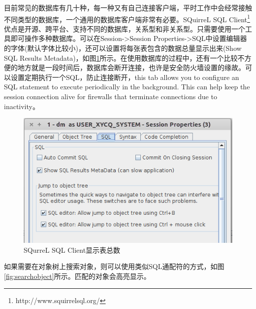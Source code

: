 \documentclass[12pt]{book}
\numberwithin{dummy}{section}
\theoremstyle{ocrenumbox}
\theoremstyle{blacknumex}
\theoremstyle{blacknumbox}
\theoremstyle{ocrenum}
\begin{document}
目前常见的数据库有几十种，每一种又有自己连接客户端，平时工作中会经常接触不同类型的数据库，一个通用的数据库客户端非常有必要。SQuirreL SQL Client\footnote{http://www.squirrelsql.org/}优点是开源、跨平台、支持不同的数据库，关系型和非关系型。只需要使用一个工具即可操作多种数据库。可以在Session->Session Properties->SQL中设置编辑器的字体(默认字体比较小)，还可以设置将每张表包含的数据总量显示出来(Show SQL Results Metadata)，如图\ref{fig:showtableresultcount}所示。在使用数据库的过程中，还有一个比较不方便的地方就是一段时间后，数据库会断开连接，也许是安全防火墙设置的缘故。可以设置定期执行一个SQL，防止连接断开，this tab allows you to configure an SQL statement to execute periodically in the background. This can help keep the session connection alive for firewalls that terminate connections due to inactivity。

\begin{figure}[htbp]
	\centering
	\includegraphics[scale=0.4]{showtableresultcount.png}
	\caption{SQurreL SQL Client显示表总数}
	\label{fig:showtableresultcount}
\end{figure}

如果需要在对象树上搜索对象，则可以使用类似SQL通配符的方式，如图\ref{fig:searchobject}所示。匹配的对象会高亮显示。
\end{document}
